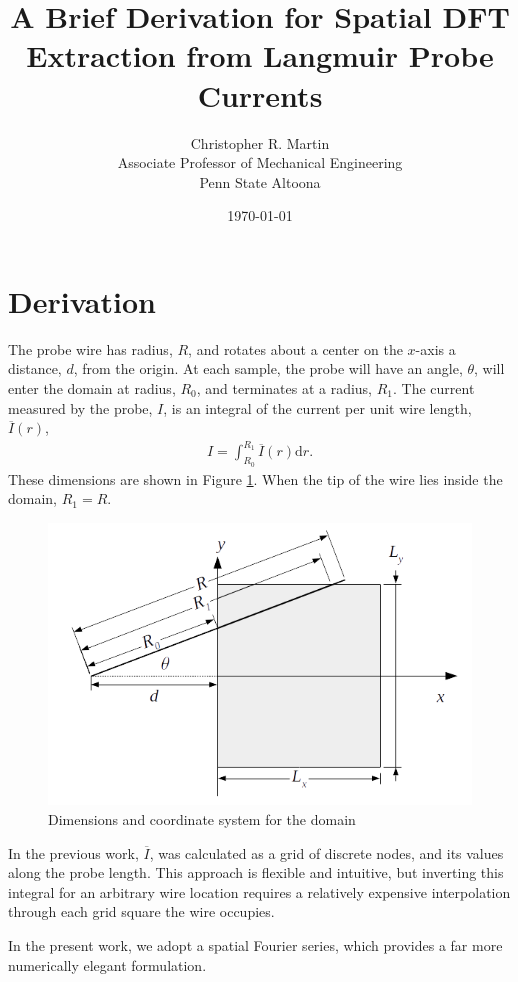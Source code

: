 \documentclass{article}
\title{A Brief Derivation for Spatial DFT Extraction from Langmuir Probe Currents}
\author{Christopher R. Martin\\Associate Professor of Mechanical Engineering\\Penn State Altoona}
\date{\today}
\def\I{\overline{I}}
\def\d{\mathrm{d}}
\begin{document}
\maketitle

\section{Derivation}

The probe wire has radius, $R$, and rotates about a center on the $x$-axis a distance, $d$, from the origin.  At each sample, the probe will have an angle, $\theta$, will enter the domain at radius, $R_0$, and terminates at a radius, $R_1$.  The current measured by the probe, $I$, is an integral of the current per unit wire length, $\I(r)$,
\begin{align}
I = \int_{R_0}^{R_1} \I(r) \d r.
\end{align}
These dimensions are shown in Figure \ref{fig:coords}.  When the tip of the wire lies inside the domain, $R_1 = R$.

\begin{figure}
\centering
\includegraphics[width=.9\linewidth]{figures/coords}
\caption{Dimensions and coordinate system for the domain}\label{fig:coords}
\end{figure}

In the previous work, $\I$, was calculated as a grid of discrete nodes, and its values along the probe length.  This approach is flexible and intuitive, but inverting this integral for an arbitrary wire location requires a relatively expensive interpolation through each grid square the wire occupies.  

In the present work, we adopt a spatial Fourier series, which provides a far more numerically elegant formulation.
\end{document}
